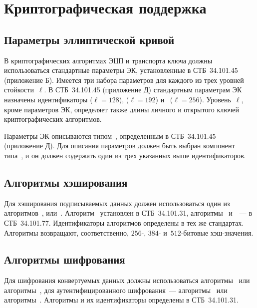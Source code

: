 \chapter{Криптографическая поддержка}\label{CRYPTO}

\section{Параметры эллиптической кривой}\label{CRYPTO.Params}

В криптографических алгоритмах ЭЦП и транспорта ключа должны
использоваться стандартные параметры ЭК, 
установленные в СТБ~34.101.45 (приложение Б). 
%
Имеется три набора параметров для каждого из трех уровней стойкости~$\ell$.
%
В СТБ~34.101.45 (приложение Д) стандартным параметрам ЭК назначены 
идентификаторы 
 ($\ell=128$), 
 ($\ell=192$)
и~ ($\ell=256$).
%
Уровень~$\ell$, кроме параметров ЭК, определяет также длины личного и 
открытого ключей криптографических алгоритмов.

Параметры ЭК описываются типом~,
определенным в СТБ~34.101.45 (приложение Д). Для описания параметров
должен быть выбран компонент~ типа~,
и он должен содержать один из трех указанных выше идентификаторов.

\section{Алгоритмы хэширования}\label{CRYPTO.Hash}

Для хэширования подписываемых данных должен использоваться один из
алгоритмов~,  или~.
%
Алгоритм~ установлен в СТБ~34.101.31,
алгоритмы~ и~~--- в СТБ~34.101.77.
%
Идентификаторы алгоритмов определены в тех же стандартах.
%
Алгоритмы возвращают, соответственно, $256$-, $384$- и~$512$-битовые 
хэш-значения.

\section{Алгоритмы шифрования}\label{CRYPTO.Encr}

Для шифрования конвертуемых данных должны использоваться 
алгоритмы~ или алгоритмы~, 
для аутентифицированного шифрования~--- алгоритмы~ или 
алгоритмы~. 
%
Алгоритмы и их идентификаторы определены в СТБ~34.101.31.

